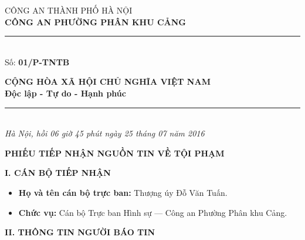 \documentclass[12pt,a4paper]{article}
\begin{document}
\noindent
\begin{minipage}[t]{0.46\textwidth}
    \begin{center}
        \fontsize{11pt}{13pt}\selectfont
        CÔNG AN THÀNH PHỐ HÀ NỘI\\
        \textbf{CÔNG AN PHƯỜNG PHÂN KHU CẢNG}\\[-0.2em]
        \rule{3.2cm}{0.6pt}\\[0.25cm]
        \fontsize{11pt}{13pt}\selectfont Số: \textbf{01/P-TNTB}
    \end{center}
\end{minipage}
\hfill
\begin{minipage}[t]{0.52\textwidth}
    \begin{center}
        \fontsize{11pt}{13pt}\selectfont
        \textbf{CỘNG HÒA XÃ HỘI CHỦ NGHĨA VIỆT NAM}\\
        \textbf{Độc lập - Tự do - Hạnh phúc}\\[-0.2em]
        \rule{3.6cm}{0.6pt}\\[0.25cm]
        \textit{Hà Nội, hồi 06 giờ 45 phút ngày 25 tháng 07 năm 2016}
    \end{center}
\end{minipage}

\vspace{0.5cm}

\begin{center}
    \textbf{\Large PHIẾU TIẾP NHẬN NGUỒN TIN VỀ TỘI PHẠM}\\[0.15cm]
    \textit{}
\end{center}

\vspace{0.3cm}



\vspace{0.3cm}\noindent\textbf{\large I. CÁN BỘ TIẾP NHẬN}\\[0.15cm]

\begin{itemize}[leftmargin=*, itemsep=2pt, topsep=2pt, parsep=0pt]
  \item \textbf{Họ và tên cán bộ trực ban:} Thượng úy Đỗ Văn Tuấn.
  \item \textbf{Chức vụ:} Cán bộ Trực ban Hình sự — Công an Phường Phân khu Cảng.


\end{itemize}

\vspace{0.3cm}\noindent\textbf{\large II. THÔNG TIN NGƯỜI BÁO TIN}\\[0.15cm]
\end{document}
